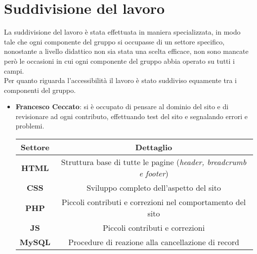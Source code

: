\section{Suddivisione del lavoro}
\label{sec:organization}
La suddivisione del lavoro è stata effettuata in maniera specializzata, in modo tale che ogni componente del gruppo si occupasse di un settore specifico, nonostante a livello didattico non sia stata una scelta efficace, non sono mancate però le occasioni in cui ogni componente del gruppo abbia operato su tutti i campi. \\
Per quanto riguarda l'accessibilità il lavoro è stato suddiviso equamente tra i componenti del gruppo. 

\begin{itemize}
    \item \textbf{Francesco Ceccato}: si è occupato di pensare al dominio del sito e di revisionare ad ogni contributo, effettuando test del sito e segnalando errori e problemi.
    \begin{center}
        \begin{tabular}{| c | c |}
            \hline
            \textbf{Settore} & \textbf{Dettaglio}  \\ [0.5ex]
            \hline \hline
            \textbf{HTML} & Struttura base di tutte le pagine (\textit{header, breadcrumb e footer}) \\
            \hline
            \textbf{CSS} & Sviluppo completo dell'aspetto del sito \\
            \hline
            \textbf{PHP} & Piccoli contributi e correzioni nel comportamento del sito \\
            \hline
            \textbf{JS} & Piccoli contributi e correzioni \\
            \hline
            \textbf{MySQL} & Procedure di reazione alla cancellazione di record \\
            \hline
        \end{tabular}
    \end{center}


\end{itemize}

